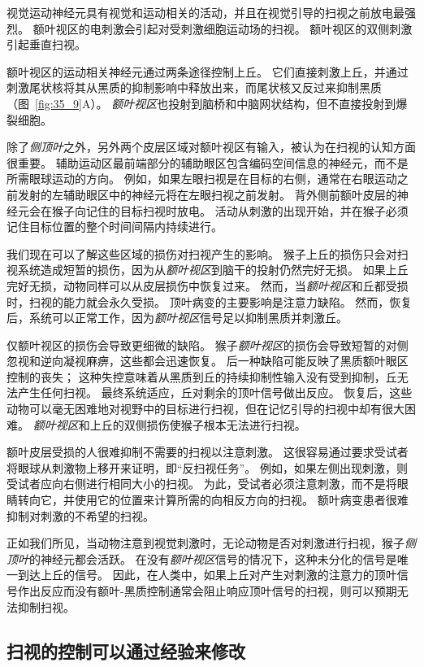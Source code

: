 视觉运动神经元具有视觉和运动相关的活动，并且在视觉引导的扫视之前放电最强烈。
额叶视区的电刺激会引起对受刺激细胞运动场的扫视。 额叶视区的双侧刺激引起垂直扫视。


额叶视区的运动相关神经元通过两条途径控制上丘。
它们直接刺激上丘，并通过刺激尾状核将其从黑质的抑制影响中释放出来，而尾状核又反过来抑制黑质（图~\ref{fig:35_9}A）。
\textit{额叶视区}也投射到脑桥和中脑网状结构，但不直接投射到爆裂细胞。


除了\textit{侧顶叶}之外，另外两个皮层区域对额叶视区有输入，被认为在扫视的认知方面很重要。
辅助运动区最前端部分的辅助眼区包含编码空间信息的神经元，而不是所需眼球运动的方向。
例如，如果左眼扫视是在目标的右侧，通常在右眼运动之前发射的左辅助眼区中的神经元将在左眼扫视之前发射。
背外侧前额叶皮层的神经元会在猴子向记住的目标扫视时放电。
活动从刺激的出现开始，并在猴子必须记住目标位置的整个时间间隔内持续进行。


我们现在可以了解这些区域的损伤对扫视产生的影响。
猴子上丘的损伤只会对扫视系统造成短暂的损伤，因为从\textit{额叶视区}到脑干的投射仍然完好无损。
如果上丘完好无损，动物同样可以从皮层损伤中恢复过来。
然而，当\textit{额叶视区}和丘都受损时，扫视的能力就会永久受损。
顶叶病变的主要影响是注意力缺陷。
然而，恢复后，系统可以正常工作，因为\textit{额叶视区}信号足以抑制黑质并刺激丘。


仅额叶视区的损伤会导致更细微的缺陷。
猴子\textit{额叶视区}的损伤会导致短暂的对侧忽视和逆向凝视麻痹，这些都会迅速恢复。
后一种缺陷可能反映了黑质额叶眼区控制的丧失；
这种失控意味着从黑质到丘的持续抑制性输入没有受到抑制，丘无法产生任何扫视。
最终系统适应，丘对剩余的顶叶信号做出反应。
恢复后，这些动物可以毫无困难地对视野中的目标进行扫视，但在记忆引导的扫视中却有很大困难。
\textit{额叶视区}和上丘的双侧损伤使猴子根本无法进行扫视。


额叶皮层受损的人很难抑制不需要的扫视以注意刺激。
这很容易通过要求受试者将眼球从刺激物上移开来证明，即“反扫视任务”。
例如，如果左侧出现刺激，则受试者应向右侧进行相同大小的扫视。
为此，受试者必须注意刺激，而不是将眼睛转向它，并使用它的位置来计算所需的向相反方向的扫视。
额叶病变患者很难抑制对刺激的不希望的扫视。


正如我们所见，当动物注意到视觉刺激时，无论动物是否对刺激进行扫视，猴子\textit{侧顶叶}的神经元都会活跃。
在没有\textit{额叶视区}信号的情况下，这种未分化的信号是唯一到达上丘的信号。
因此，在人类中，如果上丘对产生对刺激的注意力的顶叶信号作出反应而没有额叶-黑质控制通常会阻止响应顶叶信号的扫视，则可以预期无法抑制扫视。



\subsection{扫视的控制可以通过经验来修改}

